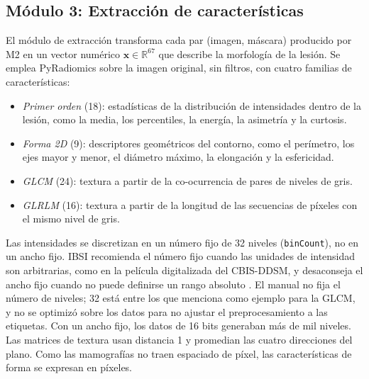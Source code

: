 
\subsection{Módulo 3: Extracción de características}
\label{sec:modulo3}

El módulo de extracción transforma cada par (imagen, máscara) producido por M2 en un vector
numérico $\mathbf{x}\in\mathbb{R}^{67}$ que describe la morfología de la lesión. Se emplea
PyRadiomics \cite{vanGriethuysen2017} sobre la imagen original, sin filtros, con cuatro familias de
características:

\begin{itemize}
  \item \textit{Primer orden} (18): estadísticas de la distribución de intensidades dentro de la
        lesión, como la media, los percentiles, la energía, la asimetría y la curtosis.
  \item \textit{Forma 2D} (9): descriptores geométricos del contorno, como el perímetro, los
        ejes mayor y menor, el diámetro máximo, la elongación y la esfericidad.
  \item \textit{GLCM} (24): textura a partir de la co-ocurrencia de pares de niveles de gris.
  \item \textit{GLRLM} (16): textura a partir de la longitud de las secuencias de píxeles con el
        mismo nivel de gris.
\end{itemize}

Las intensidades se discretizan en un número fijo de 32 niveles (\texttt{binCount}), no en un
ancho fijo. IBSI recomienda el número fijo cuando las unidades de intensidad son arbitrarias, como
en la película digitalizada del CBIS-DDSM, y desaconseja el ancho fijo cuando no puede definirse un
rango absoluto \cite{Zwanenburg2020IBSI}. El manual no fija el número de niveles; 32 está entre los
que menciona como ejemplo para la GLCM, y no se optimizó sobre los datos para no ajustar el
preprocesamiento a las etiquetas. Con un ancho fijo, los datos de 16 bits generaban más de mil niveles. Las matrices de textura usan distancia 1 y
promedian las cuatro direcciones del plano. Como las mamografías no traen espaciado de píxel, las
características de forma se expresan en píxeles.

